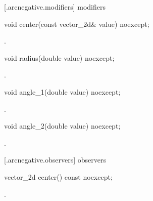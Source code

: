 [\iotwod.arcnegative.modifiers]{ modifiers}

\begin{itemdecl}
    void center(const vector_2d& value) noexcept;
\end{itemdecl}
\begin{itemdescr}
	\pnum
	\postconditions
	.
	
\end{itemdescr}

\begin{itemdecl}
    void radius(double value) noexcept;
\end{itemdecl}
\begin{itemdescr}
	\pnum
	\postconditions
	.
	
\end{itemdescr}

\begin{itemdecl}
    void angle_1(double value) noexcept;
\end{itemdecl}
\begin{itemdescr}
	\pnum
	\postconditions
	.
	
\end{itemdescr}

\begin{itemdecl}
    void angle_2(double value) noexcept;
\end{itemdecl}
\begin{itemdescr}
	\pnum
	\postconditions
	.
	
\end{itemdescr}

 [\iotwod.arcnegative.observers]{ observers}

\begin{itemdecl}
    vector_2d center() const noexcept;
\end{itemdecl}
\begin{itemdescr}
	\pnum
	\returns
	.

\end{itemdescr}

